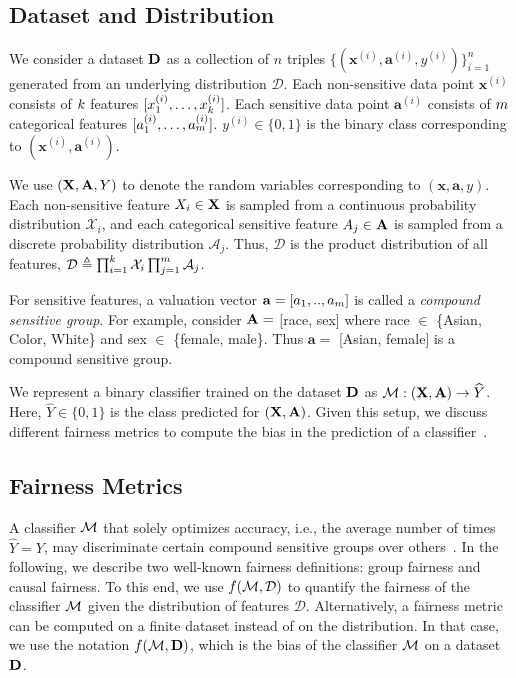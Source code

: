 \subsection{Dataset and Distribution}
We consider a dataset $ \mathbf{D} $ as a collection of $n$ triples  $\{(\mathbf{x}^{(i)}, \mathbf{a}^{(i)}, y^{(i)})\}_{i=1}^n$ generated from an underlying distribution $\mathcal{D}$. Each non-sensitive data point $\mathbf{x}^{(i)}$ consists of $k$ features $[x^{(i)}_1, \dots, x^{(i)}_{k}] $. Each sensitive data point $\mathbf{a}^{(i)}$ consists of $m$ categorical features $[a^{(i)}_1, \dots, a^{(i)}_{m}] $.  $y^{(i)} \in \{0,1\}$ is the binary class corresponding to $(\mathbf{x}^{(i)}, \mathbf{a}^{(i)})$. 

We use $ (\mathbf{X}, \mathbf{A}, Y) $ to denote the random variables corresponding to $ (\mathbf{x}, \mathbf{a}, y)$.  Each non-sensitive feature $ X_i \in \mathbf{X} $ is sampled from a continuous probability distribution {$ \mathcal{X}_i $}, and each categorical sensitive feature $ A_j \in \mathbf{A} $ is sampled from a discrete probability distribution {$ \mathcal{A}_j $}. Thus, $ \mathcal{D} $ is the product distribution of all features, $ \mathcal{D} \triangleq \prod_{i=1}^{k}\mathcal{X}_i \prod_{j=1}^{m} \mathcal{A}_j $.

For sensitive features, a valuation vector $ \mathbf{a} = [a_1, .., a_{m}] $ is called a \textit{compound sensitive group}. For example, consider $ \mathbf{A} = $ [race, sex] where race $ \in $ \{Asian, Color, White\} and sex $ \in $ \{female, male\}. Thus $ \mathbf{a} = $ [Asian, female]  is a compound sensitive group.


We represent a binary classifier trained on the dataset $\mathbf{D}$ as $\mathcal{M}: (\mathbf{X}, \mathbf{A}) \rightarrow \widehat{Y} $. Here, $\widehat{Y} \in \{0,1\}$ is the class predicted for $ (\mathbf{X}, \mathbf{A}) $. Given this setup, we discuss different fairness metrics to compute the bias in the prediction of a classifier~\cite{feldman2015certifying,hardt2016equality,nabi2018fair}.


\subsection{Fairness Metrics}

A classifier $\mathcal{M}$ that solely optimizes accuracy, i.e., the average number of times $\widehat{Y} = Y$, may discriminate certain compound sensitive groups over others~\cite{chouldechova2020snapshot}. In the following, we describe two well-known fairness definitions: group fairness and causal fairness. To this end, we use $ f(\mathcal{M}, \mathcal{D}) $ to quantify the fairness of the classifier $ \mathcal{M} $ given the distribution of features $ \mathcal{D} $. Alternatively, a fairness metric can be computed on a finite dataset instead of on the distribution. In that case, we use the notation $ f(\mathcal{M}, \mathbf{D}) $, which is the bias of the classifier $ \mathcal{M} $ on a dataset $ \mathbf{D} $. 

